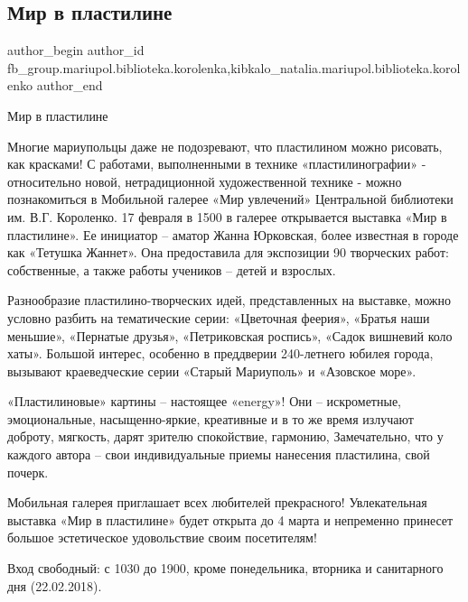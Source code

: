  
 
 
 
 

\subsection{Мир в пластилине}
\label{sec:14_02_2018.fb.fb_group.mariupol.biblioteka.korolenka.1.mir_v_plastiline}
 
\ifcmt
 author_begin
   author_id fb_group.mariupol.biblioteka.korolenka,kibkalo_natalia.mariupol.biblioteka.korolenko
 author_end
\fi

Мир в пластилине

Многие мариупольцы даже не подозревают, что пластилином можно рисовать, как
красками! С работами, выполненными в технике «пластилинографии» - относительно
новой, нетрадиционной художественной технике - можно познакомиться в Мобильной
галерее «Мир увлечений» Центральной библиотеки им. В.Г. Короленко. 17 февраля в
1500 в галерее открывается выставка «Мир в пластилине». Ее инициатор – аматор
Жанна Юрковская, более известная в городе как «Тетушка Жаннет». Она
предоставила для экспозиции 90 творческих работ: собственные, а также работы
учеников – детей и взрослых.

Разнообразие пластилино-творческих идей, представленных на выставке, можно
условно разбить на тематические серии: «Цветочная феерия», «Братья наши
меньшие», «Пернатые друзья», «Петриковская роспись», «Садок вишневий коло
хаты». Большой интерес, особенно в преддверии 240-летнего юбилея города,
вызывают краеведческие серии «Старый Мариуполь» и «Азовское море». 

«Пластилиновые» картины – настоящее «energy»! Они – искрометные, эмоциональные,
насыщенно-яркие, креативные и в то же время излучают  доброту, мягкость, дарят
зрителю спокойствие, гармонию, Замечательно, что у каждого автора – свои
индивидуальные приемы нанесения пластилина, свой почерк.

Мобильная галерея приглашает всех любителей прекрасного! Увлекательная выставка
«Мир в пластилине» будет открыта до 4 марта и непременно принесет большое
эстетическое удовольствие своим посетителям!

Вход свободный: с 1030 до 1900, кроме понедельника, вторника и санитарного дня
(22.02.2018).
